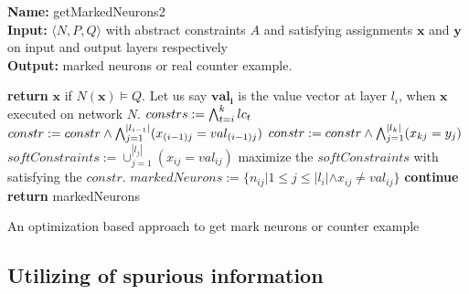 \begin{algorithm}[t]
  \textbf{Name: } getMarkedNeurons2 \\
  \textbf{Input: } $\langle N,P,Q \rangle$ with abstract constraints $A$ and satisfying assignments $\boldsymbol{x}$ and $\boldsymbol{y}$ on input and output layers respectively\\
  \textbf{Output: } marked neurons or real counter example. 
  \begin{algorithmic}[1]
    \State \textbf{return} $\boldsymbol{x}$ if $N(\boldsymbol{x}) \models Q$. 
    \State Let us say $\boldsymbol{val_{i}}$ is the value vector at layer $l_i$, when $\boldsymbol{x}$ executed on network $N$. 
     
        \State $constrs := \bigwedge_{t=i}^k lc_t$
        \State $constr := constr \land \bigwedge_{j=1}^{|l_{i-1}|} (x_{(i-1)j} = val_{(i-1)j})$
        \State $constr := constr \land \bigwedge_{j=1}^{|l_k|} (x_{kj} = y_{j})$
        \State $softConstraints := \cup_{j=1}^{|l_j|} (x_{ij} = val_{ij})$
        \State maximize the $softConstraints$ with satisfying the $constr$. 
        \State $markedNeurons := \{n_{ij} | 1 \leq j \leq |l_i| \land x_{ij} \neq val_{ij}\}$ 
          \State \textbf{continue}
        \Else
          \State \textbf{return} markedNeurons
        \EndIf 
      \EndIf
    \EndFor
  \end{algorithmic}
  \caption{An optimization based approach to get mark neurons or counter example}
  \label{algo:refine2}
\end{algorithm}






\subsection{Utilizing of spurious information}

